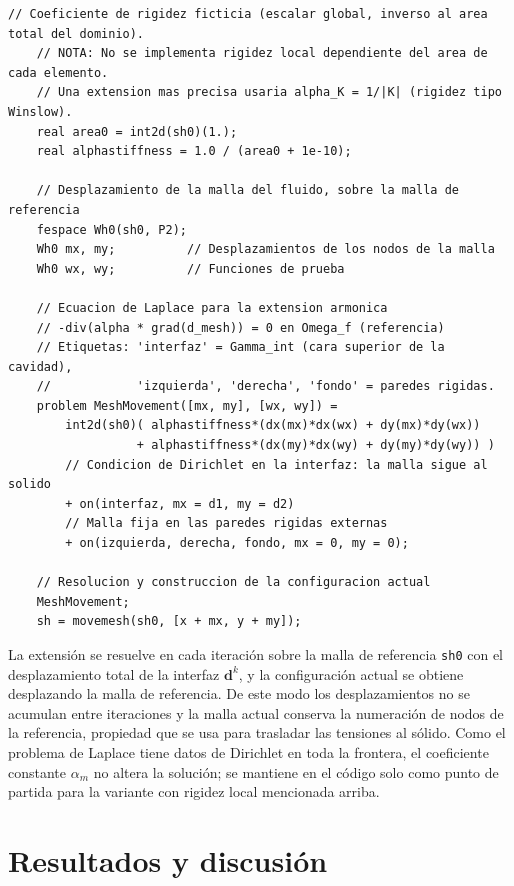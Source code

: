 \documentclass[12pt, letterpaper]{report}
\theoremstyle{definition}
\begin{document}
\begin{lstlisting}[caption={Problema auxiliar ALE para el movimiento de malla}]
    // Coeficiente de rigidez ficticia (escalar global, inverso al area total del dominio).
    // NOTA: No se implementa rigidez local dependiente del area de cada elemento.
    // Una extension mas precisa usaria alpha_K = 1/|K| (rigidez tipo Winslow).
    real area0 = int2d(sh0)(1.);
    real alphastiffness = 1.0 / (area0 + 1e-10);

    // Desplazamiento de la malla del fluido, sobre la malla de referencia
    fespace Wh0(sh0, P2);
    Wh0 mx, my;          // Desplazamientos de los nodos de la malla
    Wh0 wx, wy;          // Funciones de prueba

    // Ecuacion de Laplace para la extension armonica
    // -div(alpha * grad(d_mesh)) = 0 en Omega_f (referencia)
    // Etiquetas: 'interfaz' = Gamma_int (cara superior de la cavidad),
    //            'izquierda', 'derecha', 'fondo' = paredes rigidas.
    problem MeshMovement([mx, my], [wx, wy]) =
        int2d(sh0)( alphastiffness*(dx(mx)*dx(wx) + dy(mx)*dy(wx))
                  + alphastiffness*(dx(my)*dx(wy) + dy(my)*dy(wy)) )
        // Condicion de Dirichlet en la interfaz: la malla sigue al solido
        + on(interfaz, mx = d1, my = d2)
        // Malla fija en las paredes rigidas externas
        + on(izquierda, derecha, fondo, mx = 0, my = 0);

    // Resolucion y construccion de la configuracion actual
    MeshMovement;
    sh = movemesh(sh0, [x + mx, y + my]);
\end{lstlisting}

La extensión se resuelve en cada iteración sobre la malla de referencia \texttt{sh0} con el desplazamiento total de la interfaz $\mathbf{d}^{k}$, y la configuración actual se obtiene desplazando la malla de referencia. De este modo los desplazamientos no se acumulan entre iteraciones y la malla actual conserva la numeración de nodos de la referencia, propiedad que se usa para trasladar las tensiones al sólido. Como el problema de Laplace tiene datos de Dirichlet en toda la frontera, el coeficiente constante $\alpha_m$ no altera la solución; se mantiene en el código solo como punto de partida para la variante con rigidez local mencionada arriba.

\section{Resultados y discusión}
\label{sec:resultados}
\end{document}
